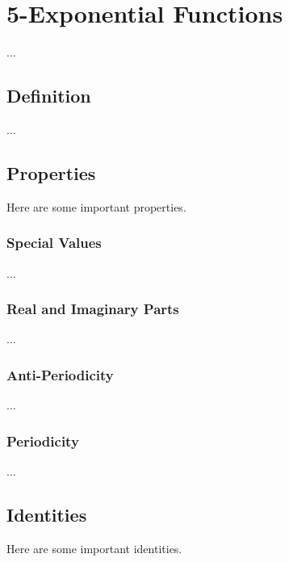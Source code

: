 \chapter{5-Exponential Functions}
...
\section{Definition}
...
\section{Properties}
Here are some important properties.
\subsection{Special Values}
...
\subsection{Real and Imaginary Parts}
...
\subsection{Anti-Periodicity}
...
\subsection{Periodicity}
...
\section{Identities}
Here are some important identities.
